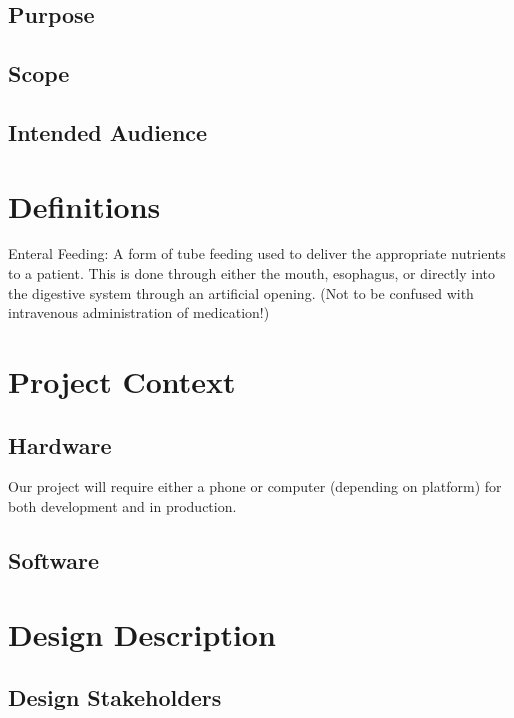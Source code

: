 \documentclass[onecolumn, draftclsnofoot,10pt, compsoc]{IEEEtran}
\begin{document}
\subsection{Purpose}
\subsection{Scope}
\subsection{Intended Audience}

\section{Definitions}
Enteral Feeding: A form of tube feeding used to deliver the appropriate nutrients to a patient. This is done through either the mouth, esophagus, or directly into the digestive system through an artificial opening. (Not to be confused with intravenous administration of medication!)
\newline
\newline

\section{Project Context}
\subsection{Hardware}
Our project will require either a phone or computer (depending on platform) for both development and in production.
\subsection{Software}

\section{Design Description}
\subsection{Design Stakeholders}
\end{document}
